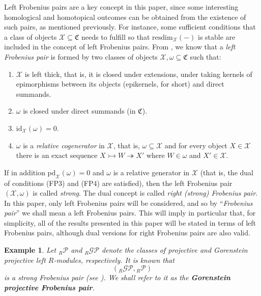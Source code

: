 \documentclass[10pt,reqno]{amsart}
\numberwithin{equation}{section}
\newtheorem{example}[definition]{Example}
\theoremstyle{remark}
\newcommand{\X}{\mathcal{X}}
\newcommand{\pd}{\mathrm{pd}}
\newcommand{\id}{\mathrm{id}}
\newcommand{\resdim}{\mathrm{resdim}}
\begin{document}
Left Frobenius pairs are a key concept in this paper, since some interesting homological and homotopical outcomes can be obtained from the existence of such pairs, as mentioned previously. For instance, some sufficient conditions that a class of objects $\X \subseteq \mathfrak{C}$ needs to fulfill so that $\resdim_{\X}(-)$ is stable are included in the concept of left Frobenius pairs. From \cite[Def. 2.5]{BMSP}, we know that a \emph{left Frobenius pair} is formed by two classes of objects $\X, \omega \subseteq \mathfrak{C}$ such that:
\begin{enumerate}[(1)]
\item[{\sf (FP1)}] $\mathcal{X}$ is left thick, that is, it is closed under extensions, under taking kernels of epimorphisms between its objects (epikernels, for short) and direct summands. 

\item[{\sf (FP2)}] $\omega$ is closed under direct summands (in $\mathfrak{C}$).

\item[{\sf (FP3)}] $\id_{\mathcal{X}}(\omega) = 0$.

\item[{\sf (FP4)}] $\omega$ is a \emph{relative cogenerator} in $\mathcal{X}$, that is, $\omega \subseteq \X$ and for every object $X \in \mathcal{X}$ there is an exact sequence $X \rightarrowtail W \twoheadrightarrow X'$ where $W \in \omega$ and $X' \in \mathcal{X}$. 
\end{enumerate}
If in addition $\pd_{\X}(\omega) = 0$ and $\omega$ is a relative generator in $\X$ (that is, the dual of conditions {\sf (FP3)} and {\sf (FP4)} are satisfied), then the left Frobenius pair $(\X,\omega)$ is called \emph{strong}. The dual concept is called \emph{right (strong) Frobenius pair}.  In this paper, only left Frobenius pairs will be considered, and so by ``\emph{Frobenius pair}'' we shall mean a left Frobenius pairs. This will imply in particular that, for simplicity, all of the results presented in this paper will be stated in terms of left Frobenius pairs, although dual versions for right Frobenius pairs are also valid. 


\begin{example}\label{ex:FP-GP}
Let ${}_R\mathcal{P}$ and ${}_R\mathcal{GP}$ denote the classes of projective and Gorenstein projective left $R$-modules, respectively. It is known that $$({}_R\mathcal{GP},{}_R\mathcal{P})$$ is a strong Frobenius pair (see \cite[Prop. 6.1]{BMSP}). We shall refer to it as the \textbf{Gorenstein projective Frobenius pair}.
\end{example}
\end{document}

